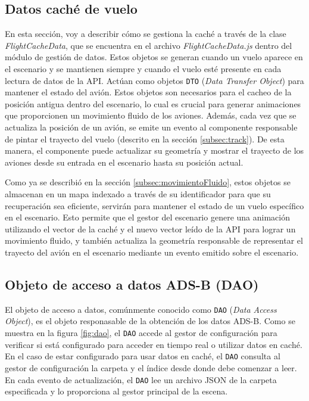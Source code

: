 \documentclass[a4paper, 11pt]{book}
\begin{document}
\subsection{Datos caché de vuelo}
\label{subsec:datosCacheVuelo}
En esta sección, voy a describir cómo se gestiona la caché a través de la clase \emph{FlightCacheData}, que se encuentra en el archivo \emph{FlightCacheData.js} dentro del módulo de gestión de datos.
Estos objetos se generan cuando un vuelo aparece en el escenario y se mantienen siempre y cuando el vuelo esté presente en cada lectura de datos de la \textsc{API}. Actúan como objetos \texttt{\gls{DTO}} (\emph{Data Transfer Object}) para mantener el estado del avión.
Estos objetos son necesarios para el cacheo de la posición antigua dentro del escenario, lo cual es crucial para generar animaciones que proporcionen un movimiento fluido de los aviones. 
Además, cada vez que se actualiza la posición de un avión, se emite un evento al componente responsable de pintar el trayecto del vuelo (descrito en la sección \ref{subsec:track}). De esta manera, el componente puede actualizar su geometría y mostrar el trayecto de los aviones desde su entrada en el escenario hasta su posición actual.

Como ya se describió en la sección \ref{subsec:movimientoFluido}, estos objetos se almacenan en un mapa indexado a través de su identificador para que su recuperación sea eficiente, servirán para mantener el estado de un vuelo específico en el escenario. Esto permite que el gestor del escenario genere una animación utilizando el vector de la caché y el nuevo vector leído de la API para lograr un movimiento fluido, y también actualiza la geometría responsable de representar el trayecto del avión en el escenario mediante un evento emitido sobre el escenario.
\subsection{Objeto de acceso a datos ADS-B (\gls{DAO})}
\label{subsec:dao}
El objeto de acceso a datos, comúnmente conocido como \texttt{\gls{DAO}} (\emph{Data Access Object}), es el objeto responasable de la obtención de los datos ADS-B. Como se muestra en la figura \ref{fig:dao}, el \texttt{DAO} accede al gestor de configuración para verificar si está configurado para acceder en tiempo real o utilizar datos en caché. 
En el caso de estar configurado para usar datos en caché, el \texttt{DAO} consulta al gestor de configuración la carpeta y el índice desde donde debe comenzar a leer. En cada evento de actualización, el \texttt{DAO} lee un archivo \textsc{\gls{JSON}} de la carpeta especificada y lo proporciona al gestor principal de la escena.
\end{document}
